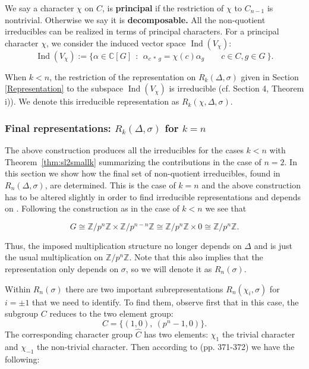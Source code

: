 \documentclass[12pt,reqno]{amsart}
\theoremstyle{remark}
\numberwithin{table}{section}
\newcommand{\C}{\mathbb C}
\newcommand{\Z}{\mathbb Z}
\begin{document}
We say a character $\chi$ on $C$, is \textbf{principal} if the restriction of $\chi$ to $C_{n-1}$ is nontrivial. Otherwise we say it is {\bf decomposable.} All the non-quotient irreducibles can be realized in terms of principal characters. For a principal character $\chi$, we consider the induced vector space $\operatorname{Ind}(V_\chi)$:
\[ \operatorname{Ind}(V_\chi) :=  \{   \alpha \in \C[G]  \: \: : \: \:  \alpha_{c\: * \: g} = \chi(c) \alpha_{g} \quad \quad c \in C , g \in G \: \}. \]

When $k<n$, the restriction of the representation on $R_k(\Delta, \sigma)$ given in Section \ref{Representation} to the subspace $\operatorname{Ind}(V_\chi)$ is irreducible (cf. \cite{Tanaka67-2} Section 4, Theorem i)).%
 We denote this irreducible representation as $R_k(\chi, \Delta, \sigma)$. 
 
 \subsubsection{Final representations: $R_k(\Delta,\sigma)$ for $k=n$} \label{k=n} 

The above construction produces all the irreducibles for the cases $k<n$ with Theorem~\ref{thm:sl2smallk} summarizing the contributions in the case of $n=2$. In this section we show how the final set of non-quotient irreducibles, found in $R_n(\Delta,\sigma)$, are determined. This is the case of $k=n$ and the above construction has to be altered slightly in order to find irreducible representations and depends on   \cite{Kloosterman46} . Following the construction as in the case of $k<n$ we see that

\[ G \cong \Z/p^n\Z \times \Z/p^{n-n}\Z  \cong \Z/p^n\Z \times 0 \cong \Z/p^n\Z. \]

Thus,  the imposed multiplication structure no longer depends on $\Delta$ and is just the usual multiplication on $\Z/p^n\Z$. Note that this also implies that the representation only depends on $\sigma$, so we will denote it as $R_n(\sigma)$. 

Within $R_n(\sigma)$ there are two important subrepresentations $R_n(\chi_i,\sigma)$ for $i =\pm 1$ that we need to identify. To find them, observe first that in this case, the subgroup $C$ reduces to the two element group: 
\[ C = \{ (1,0), \: (p^n-1,0) \}. \]
The corresponding character group $\widehat{C}$ has two elements: $\chi_1$ the trivial character and $\chi_{-1}$ the non-trivial character. Then according to \cite{Kloosterman46} (pp. 371-372) we have the following:
\end{document}
